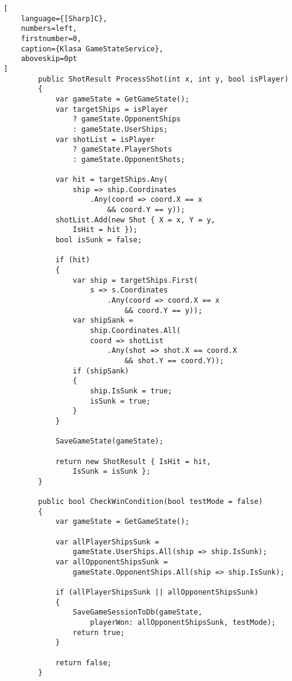 \begin{addmargin}[0mm]{0mm}
\begin{lstlisting}[
    language={[Sharp]C},
    numbers=left,
    firstnumber=0,
    caption={Klasa GameStateService},
    aboveskip=0pt
]
        public ShotResult ProcessShot(int x, int y, bool isPlayer)
        {
            var gameState = GetGameState();
            var targetShips = isPlayer
                ? gameState.OpponentShips
                : gameState.UserShips;
            var shotList = isPlayer 
                ? gameState.PlayerShots 
                : gameState.OpponentShots;

            var hit = targetShips.Any(
                ship => ship.Coordinates
                    .Any(coord => coord.X == x
                        && coord.Y == y));
            shotList.Add(new Shot { X = x, Y = y,
                IsHit = hit });
            bool isSunk = false;

            if (hit)
            {
                var ship = targetShips.First(
                    s => s.Coordinates
                        .Any(coord => coord.X == x
                            && coord.Y == y));
                var shipSank =
                    ship.Coordinates.All(
                    coord => shotList
                        .Any(shot => shot.X == coord.X
                            && shot.Y == coord.Y));
                if (shipSank)
                {
                    ship.IsSunk = true;
                    isSunk = true;
                }
            }

            SaveGameState(gameState);

            return new ShotResult { IsHit = hit,
                IsSunk = isSunk };
        }

        public bool CheckWinCondition(bool testMode = false)
        {
            var gameState = GetGameState();

            var allPlayerShipsSunk =
                gameState.UserShips.All(ship => ship.IsSunk);
            var allOpponentShipsSunk =
                gameState.OpponentShips.All(ship => ship.IsSunk);

            if (allPlayerShipsSunk || allOpponentShipsSunk)
            {
                SaveGameSessionToDb(gameState,
                    playerWon: allOpponentShipsSunk, testMode);
                return true;
            }

            return false;
        }


\end{lstlisting}
\end{addmargin}

